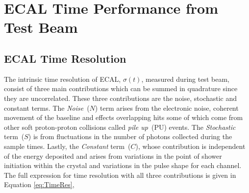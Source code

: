 \section{ECAL Time Performance from Test Beam}
\subsection{ECAL Time Resolution}
The intrinsic time resolution of ECAL, $\sigma(t)$, measured during test beam, consist of three main contributions which can be summed in quadrature since they are uncorrelated. These three contributions are the noise, stochastic and constant terms. The \textit{Noise}~($N$) term arises from the electronic noise, coherent movement of the baseline and effects overlapping hits some of which come from other soft proton-proton collisions called \textit{pile up}~(PU) events. The \textit{Stochastic} term~($S$) is from fluctuations in the number of photons collected during the sample times. Lastly, the \textit{Constant} term~($C$), whose contribution is independent of the energy deposited and arises from variations in the point of shower initiation within the crystal and variations in the pulse shape for each channel.
The full expression for time resolution with all three contributions is given in Equation \ref{eq:TimeRes},

